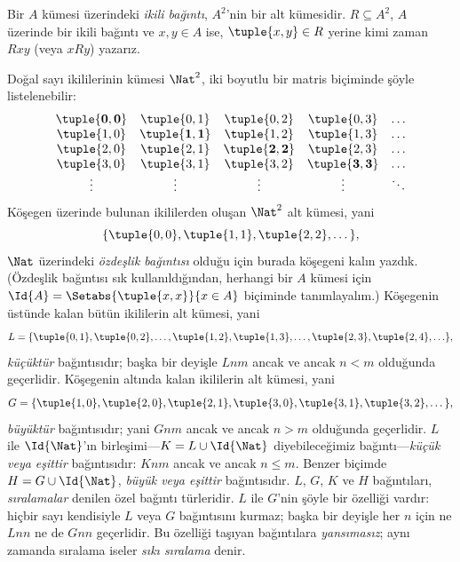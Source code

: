 \begin{defn}
Bir $A$ kümesi üzerindeki \emph{ikili bağıntı}, $A^{2}$'nin bir alt kümesidir.
$R \subseteq A^{2}$, $A$ üzerinde bir ikili bağıntı ve $x, y \in A$ ise,
$\tuple{x, y} \in R$ yerine kimi zaman $Rxy$ (veya $xRy$) yazarız.
\end{defn}

\begin{ex}
Doğal sayı ikililerinin kümesi $\Nat^{2}$, iki boyutlu bir matris biçiminde
şöyle listelenebilir:
\[
  \begin{array}{ccccc}
  \mathbf{\tuple{ 0,0 }} & \tuple{ 0,1 } &
    \tuple{ 0,2 } & \tuple{ 0,3 } & \ldots\\
  \tuple{ 1,0 } & \mathbf{\tuple{ 1,1 }} &
    \tuple{ 1,2 } & \tuple{ 1,3 } & \ldots\\
  \tuple{ 2,0 } & \tuple{ 2,1 } &
    \mathbf{\tuple{ 2,2 }} & \tuple{ 2,3 } & \ldots\\
  \tuple{ 3,0 } & \tuple{ 3,1 } & \tuple{ 3,2 } &
    \mathbf{\tuple{ 3,3 }} & \ldots\\
  \vdots & \vdots & \vdots & \vdots & \mathbf{\ddots}
  \end{array}
\]
Köşegen üzerinde bulunan ikililerden oluşan $\Nat^2$ alt kümesi, yani
\[
  \{\tuple{0,0 }, \tuple{ 1,1 }, \tuple{ 2,2 }, \dots\},
\]
$\Nat$ üzerindeki \emph{özdeşlik bağıntısı} olduğu için burada köşegeni kalın
yazdık. (Özdeşlik bağıntısı sık kullanıldığından, herhangi bir $A$ kümesi için
$\Id{A}=\Setabs{\tuple{ x,x }}{x \in A}$ biçiminde tanımlayalım.) Köşegenin
üstünde kalan bütün ikililerin alt kümesi, yani
\[
  L = \{\tuple{ 0,1 },\tuple{ 0,2 },\ldots,\tuple{ 1,2 },
  \tuple{ 1,3 }, \dots, \tuple{ 2,3 }, \tuple{ 2,4 },\ldots\},
\]
\emph{küçüktür} bağıntısıdır; başka bir deyişle $Lnm$ ancak ve ancak $n<m$
olduğunda geçerlidir. Köşegenin altında kalan ikililerin alt kümesi, yani
\[
  G=\{ \tuple{ 1,0 },\tuple{ 2,0 },\tuple{
    2,1 }, \tuple{ 3,0 },\tuple{ 3,1 },\tuple{ 3,2 }, \dots\},
\]
\emph{büyüktür} bağıntısıdır; yani $Gnm$ ancak ve ancak $n>m$ olduğunda
geçerlidir. $L$ ile $\Id{\Nat}$'ın birleşimi---$K=L\cup\Id{\Nat}$ diyebileceğimiz
bağıntı---\emph{küçük veya eşittir} bağıntısıdır: $Knm$ ancak ve ancak
$n \le m$. Benzer biçimde $H=G\cup\Id{\Nat}$, \emph{büyük veya eşittir}
bağıntısıdır. $L$, $G$, $K$ ve $H$ bağıntıları, \emph{sıralamalar} denilen özel
bağıntı türleridir. $L$ ile $G$'nin şöyle bir özelliği vardır: hiçbir sayı
kendisiyle $L$ veya $G$ bağıntısını kurmaz;
başka bir deyişle her $n$ için ne $Lnn$ ne de $Gnn$ geçerlidir. Bu özelliği
taşıyan bağıntılara \emph{yansımasız}; aynı zamanda sıralama iseler \emph{sıkı
sıralama} denir.
\end{ex}

